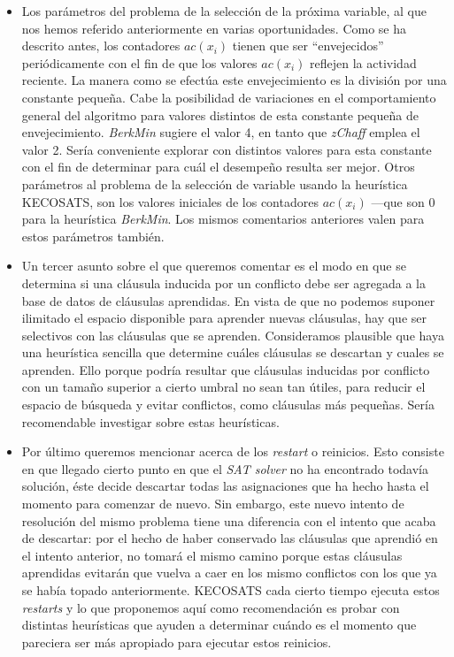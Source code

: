 \documentclass[12pt,lettersize,oneside]{article}
\begin{document}
\begin{itemize}
\item Los parámetros del problema de la selección de la próxima variable, al que
  nos hemos referido anteriormente en varias oportunidades. Como se ha descrito
  antes, los contadores $ac(x_i)$ tienen que ser ``envejecidos'' periódicamente
  con el fin de que los valores $ac(x_i)$ reflejen la actividad reciente. La
  manera como se efectúa este envejecimiento es la división por una constante
  pequeña. Cabe la posibilidad de variaciones en el comportamiento general del
  algoritmo para valores distintos de esta constante pequeña de
  envejecimiento. \emph{BerkMin} sugiere el valor 4, en tanto que \emph{zChaff}
  emplea el valor 2. Sería conveniente explorar con distintos valores para esta
  constante con el fin de determinar para cuál el desempeño resulta ser mejor.
  Otros parámetros al problema de la selección de variable usando la heurística
  KECOSATS, son los valores iniciales de los contadores $ac(x_i)$ ---que son 0
  para la heurística \emph{BerkMin}. Los mismos comentarios anteriores valen
  para estos parámetros también.

\item Un tercer asunto sobre el que queremos comentar es el modo en que se
  determina si una cláusula inducida por un conflicto debe ser agregada a la
  base de datos de cláusulas aprendidas. En vista de que no podemos suponer
  ilimitado el espacio disponible para aprender nuevas cláusulas, hay que ser
  selectivos con las cláusulas que se aprenden. Consideramos plausible que haya
  una heurística sencilla que determine cuáles cláusulas se descartan y cuales
  se aprenden. Ello porque podría resultar que cláusulas inducidas por conflicto
  con un tamaño superior a cierto umbral no sean tan útiles, para reducir el
  espacio de búsqueda y evitar conflictos, como cláusulas más pequeñas. Sería
  recomendable investigar sobre estas heurísticas.

\item Por último queremos mencionar acerca de los \emph{restart} o
  reinicios. Esto consiste en que llegado cierto punto en que el \emph{SAT
    solver} no ha encontrado todavía solución, éste decide descartar todas las
  asignaciones que ha hecho hasta el momento para comenzar de nuevo. Sin
  embargo, este nuevo intento de resolución del mismo problema tiene una
  diferencia con el intento que acaba de descartar: por el hecho de haber
  conservado las cláusulas que aprendió en el intento anterior, no tomará el
  mismo camino porque estas cláusulas aprendidas evitarán que vuelva a caer en
  los mismo conflictos con los que ya se había topado anteriormente. KECOSATS
  cada cierto tiempo ejecuta estos \emph{restarts} y lo que proponemos aquí como
  recomendación es probar con distintas heurísticas que ayuden a determinar
  cuándo es el momento que pareciera ser más apropiado para ejecutar estos
  reinicios.

\end{itemize}
\end{document}
